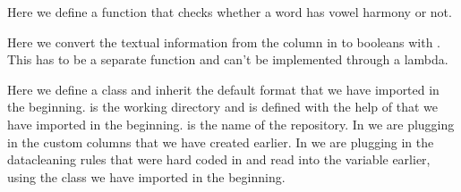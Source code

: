 \documentclass[letterpaper,10pt,english]{sphinxmanual}
\begin{document}
{{{{\sphinxAtStartPar
Here we define a function that checks whether a word has vowel harmony or not.

\begin{sphinxVerbatim}[commandchars=\\\{\}]
  
           
\end{sphinxVerbatim}

\sphinxAtStartPar
Here we convert the textual information from the column  in
 to booleans with .
This has to be a separate function and can’t be implemented through a lambda.

\begin{sphinxVerbatim}[commandchars=\\\{\}]
 
      
      
      
       
                          
\end{sphinxVerbatim}

\sphinxAtStartPar
Here we define a class and inherit the default format  that we
have imported in the beginning.  is the working directory and is
defined with the help of  that we have imported in the beginning.
 is the name of the repository. In  we are plugging in
the custom columns that we have created earlier. In  we are
plugging in the data\sphinxhyphen{}cleaning rules that were hard coded in
 and read into the  variable earlier, using the
 class we have imported in the beginning.

}}}}
\end{document}
